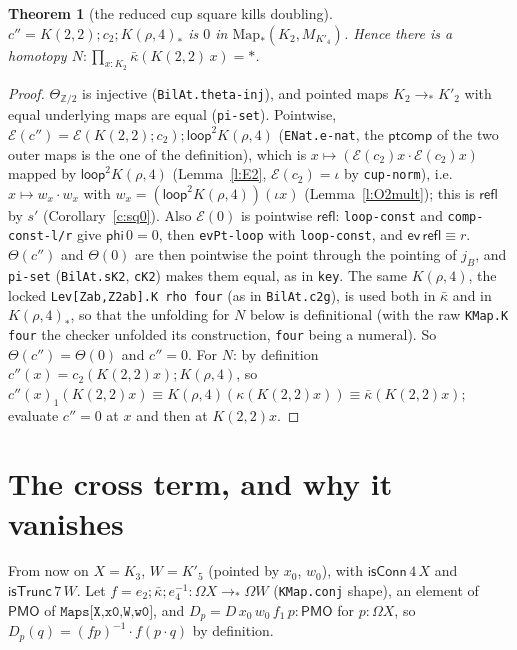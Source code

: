 \documentclass[11pt]{amsart}
\newtheorem{theorem}{Theorem}
\theoremstyle{definition}
\theoremstyle{remark}
\newcommand{\Om}{\Omega}
\newcommand{\Map}{\mathrm{Map}_*}
\newcommand{\Z}{\mathbb{Z}}
\newcommand{\code}[1]{\texttt{#1}}
\newcommand{\cT}{\mathsf{isTrunc}}
\newcommand{\cC}{\mathsf{isConn}}
\newcommand{\refl}{\mathsf{refl}}
\newcommand{\lp}{\mathsf{loop}}
\newcommand{\PMO}{\mathsf{PMO}}
\newcommand{\kb}{\bar\kappa}
\newcommand{\cE}{\mathcal E}
\begin{document}
\begin{theorem}[the reduced cup square kills doubling]\label{t:kill}
$c''=K(2,2);c_2;K(\rho,4)_*$ is $0$ in $\Map(K_2,M_{K'_4})$. Hence there
is a homotopy $N:\prod_{x:K_2}\kb(K(2,2)\,x)=*$.
\end{theorem}
\begin{proof}
$\Theta_{\Z/2}$ is injective (\code{BilAt.theta-inj}), and pointed maps
$K_2\to_*K'_2$ with equal underlying maps are equal (\code{pi-set}). Pointwise,
$\cE(c'')=\cE(K(2,2);c_2);\lp^2K(\rho,4)$ (\code{ENat.e-nat}, the
$\mathsf{ptcomp}$ of the two outer maps is the one of the definition),
which is $x\mapsto(\cE(c_2)x\cdot\cE(c_2)x)$ mapped by $\lp^2K(\rho,4)$
(Lemma~\ref{l:E2}, $\cE(c_2)=\iota$ by \code{cup-norm}), i.e.\
$x\mapsto w_x\cdot w_x$ with $w_x=(\lp^2K(\rho,4))(\iota x)$
(Lemma~\ref{l:O2mult}); this is $\refl$ by $s'$
(Corollary~\ref{c:sq0}). Also $\cE(0)$ is pointwise $\refl$: \code{loop-const} and
\code{comp-const-l/r} give $\mathsf{phi}\,0=0$, then \code{evPt-loop} with
\code{loop-const}, and $\mathsf{ev}\,\refl\equiv r$. $\Theta(c'')$ and $\Theta(0)$ are then
pointwise the point through the pointing of $j_B$, and \code{pi-set}
(\code{BilAt.sK2}, \code{cK2}) makes them equal, as in \code{key}. The
same $K(\rho,4)$, the locked \code{Lev[Zab,Z2ab].K rho four} (as in
\code{BilAt.c2g}), is used both in $\kb$ and in $K(\rho,4)_*$, so that the
unfolding for $N$ below is definitional (with the raw \code{KMap.K four} the
checker unfolded its construction, \code{four} being a numeral). So
$\Theta(c'')=\Theta(0)$ and $c''=0$.
For $N$: by definition $c''(x)=c_2(K(2,2)x);K(\rho,4)$, so
$c''(x)_1(K(2,2)x)\equiv K(\rho,4)(\kappa(K(2,2)x))\equiv\kb(K(2,2)x)$; evaluate
$c''=0$ at $x$ and then at $K(2,2)x$.
\end{proof}

\section{The cross term, and why it vanishes}

From now on $X=K_3$, $W=K'_5$ (pointed by $x_0$, $w_0$), with
$\cC\,4\,X$ and $\cT\,7\,W$. Let
$f=e_2;\kb;e_4^{-1}:\Om X\to_*\Om W$ (\code{KMap.conj} shape), an element
of $\PMO$ of $\code{Maps[X,x0,W,w0]}$, and $D_p=D\,x_0\,w_0\,f_1\,p:\PMO$
for $p:\Om X$, so $D_p(q)=(f p)^{-1}\cdot f(p\cdot q)$ by definition.
\end{document}
